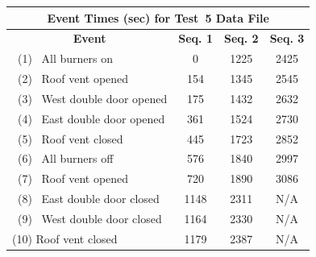 \begin{figure}[!ht]
\renewcommand{\baselinestretch}{1}
\begin{minipage}[b]{0.96\columnwidth}
\begin{center}
	\begin{tabular}{lccc}
	\multicolumn{4}{c}{\normalsize Event Times (sec) for Test~5 Data File} \\
	\toprule
	\multicolumn{1}{c}{\textbf{Event}} 	& \textbf{Seq. 1} & \textbf{Seq. 2} & \textbf{Seq. 3} \\
	\midrule
	~(1)~ All burners on 				& 	0			  &	   1225			&	   2425		\\
	~(2)~ Roof vent opened 				&   154			  &    1345			&	   2545		\\
	~(3)~ West double door opened 		&	175			  &	   1432	 		&	   2632 	\\
	~(4)~ East double door opened 		&   361			  &    1524			&	   2730		\\
	~(5)~ Roof vent closed		 		&   445			  &    1723			&	   2852		\\
	~(6)~ All burners off 				&   576			  &    1840			&	   2997		\\
	~(7)~ Roof vent opened				& 	720 		  &	   1890			&	   3086		\\
	~(8)~ East double door closed		& 	1148 		  &	   2311			&	   N/A		\\
	~(9)~ West double door closed		& 	1164 		  &	   2330			&	   N/A		\\
	(10) Roof vent closed		 		&   1179		  &    2387			&	   N/A		\\
	\bottomrule
	\end{tabular}

\end{center}
\end{minipage}
\end{figure}
